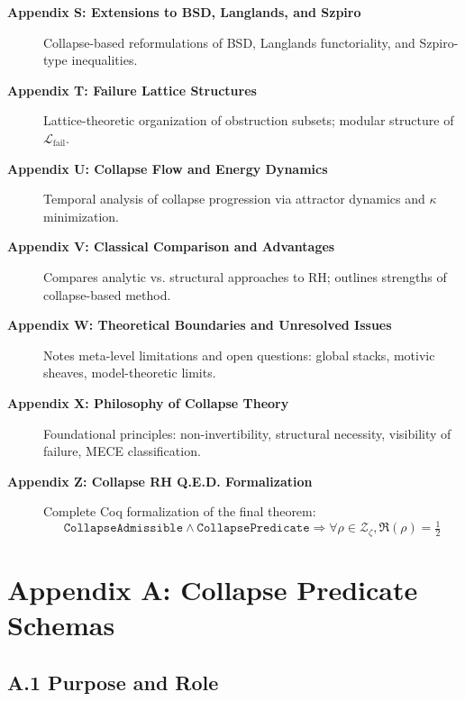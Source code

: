 \documentclass[11pt]{article}
\begin{document}
\begin{description}
  \item[\textbf{Appendix S: Extensions to BSD, Langlands, and Szpiro}]  
  Collapse-based reformulations of BSD, Langlands functoriality, and Szpiro-type inequalities.

  \item[\textbf{Appendix T: Failure Lattice Structures}]  
  Lattice-theoretic organization of obstruction subsets; modular structure of $\mathcal{L}_\mathrm{fail}$.

  \item[\textbf{Appendix U: Collapse Flow and Energy Dynamics}]  
  Temporal analysis of collapse progression via attractor dynamics and $\kappa$ minimization.

  \item[\textbf{Appendix V: Classical Comparison and Advantages}]  
  Compares analytic vs. structural approaches to RH; outlines strengths of collapse-based method.

  \item[\textbf{Appendix W: Theoretical Boundaries and Unresolved Issues}]  
  Notes meta-level limitations and open questions: global stacks, motivic sheaves, model-theoretic limits.

  \item[\textbf{Appendix X: Philosophy of Collapse Theory}]  
  Foundational principles: non-invertibility, structural necessity, visibility of failure, MECE classification.

  \item[\textbf{Appendix Z: Collapse RH Q.E.D. Formalization}]  
  Complete Coq formalization of the final theorem:  
  \[
  \texttt{CollapseAdmissible} \wedge \texttt{CollapsePredicate} \Rightarrow \forall \rho \in \mathcal{Z}_\zeta, \Re(\rho) = \tfrac{1}{2}
  \]

\end{description}



\appendix
\section*{Appendix A: Collapse Predicate Schemas}

\subsection*{A.1 Purpose and Role}
\end{document}
